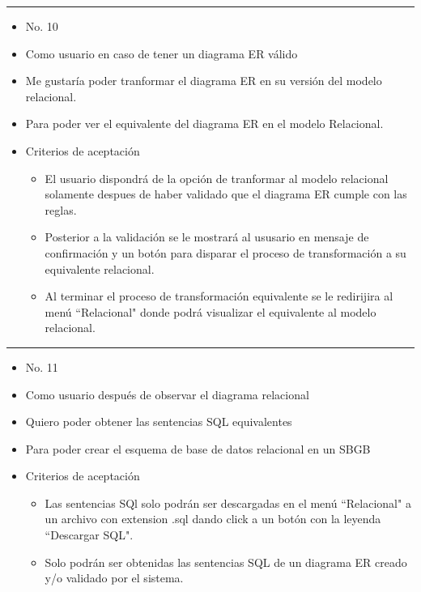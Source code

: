 \noindent\rule{\textwidth}{1pt}
\begin{itemize}
	\item No. 10
	\item Como usuario en caso de tener un diagrama ER válido
	\item Me gustaría poder tranformar el diagrama ER en su versión del modelo relacional.
	\item Para poder ver el equivalente del diagrama ER en el modelo Relacional.
	\item Criterios de aceptación
	\begin{itemize}
		\item El usuario dispondrá de la opción de tranformar al modelo relacional solamente despues de haber validado que el diagrama ER cumple con las reglas.
		\item Posterior a la validación se le mostrará al ususario en mensaje de confirmación y un botón para disparar el proceso de transformación a su equivalente relacional.
		\item Al terminar el proceso de transformación equivalente se le redirijira al menú ``Relacional" donde podrá visualizar el equivalente al modelo relacional.
	\end{itemize}
\end{itemize}
\noindent\rule{\textwidth}{1pt}
\begin{itemize}
	\item No. 11
	\item Como usuario después de observar el diagrama relacional
	\item Quiero poder obtener las sentencias SQL equivalentes
	\item Para poder crear el esquema de base de datos relacional en un SBGB
	\item Criterios de aceptación
	\begin{itemize}
		\item Las sentencias SQl solo podrán ser descargadas en el menú ``Relacional" a un archivo con extension .sql dando click a un botón con la leyenda ``Descargar SQL".
		\item Solo podrán ser obtenidas las sentencias SQL de un diagrama ER creado y/o validado por el sistema.
	\end{itemize}
\end{itemize}
